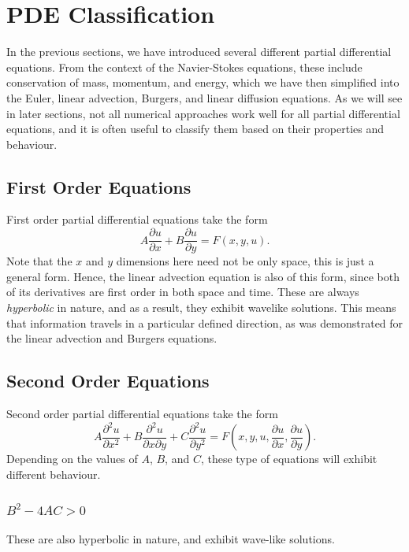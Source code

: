 \section{PDE Classification}
In the previous sections, we have introduced several different partial differential equations. From the context of the Navier-Stokes equations, these include conservation of mass, momentum, and energy, which we have then simplified into the Euler, linear advection, Burgers, and linear diffusion equations. As we will see in later sections, not all numerical approaches work well for all partial differential equations, and it is often useful to classify them based on their properties and behaviour.

\subsection{First Order Equations}
First order partial differential equations take the form
\begin{equation}
	A \frac{\partial u}{\partial x} + B \frac{\partial u}{\partial y} = F(x,y,u).
\end{equation}
Note that the $x$ and $y$ dimensions here need not be only space, this is just a general form. Hence, the linear advection equation is also of this form, since both of its derivatives are first order in both space and time. These are always {\it hyperbolic} in nature, and as a result, they exhibit wavelike solutions. This means that information travels in a particular defined direction, as was demonstrated for the linear advection and Burgers equations.

\subsection{Second Order Equations}
Second order partial differential equations take the form
\begin{equation}
	A \frac{\partial^2 u}{\partial x^2} + B \frac{\partial^2 u}{\partial x \partial y} + C \frac{\partial^2 u}{\partial y^2} = F(x,y,u,\frac{\partial u}{\partial x},\frac{\partial u}{\partial y}).
\end{equation}
Depending on the values of $A$, $B$, and $C$, these type of equations will exhibit different behaviour.

\subsubsection{$B^2-4AC > 0$}
These are also hyperbolic in nature, and exhibit wave-like solutions.

